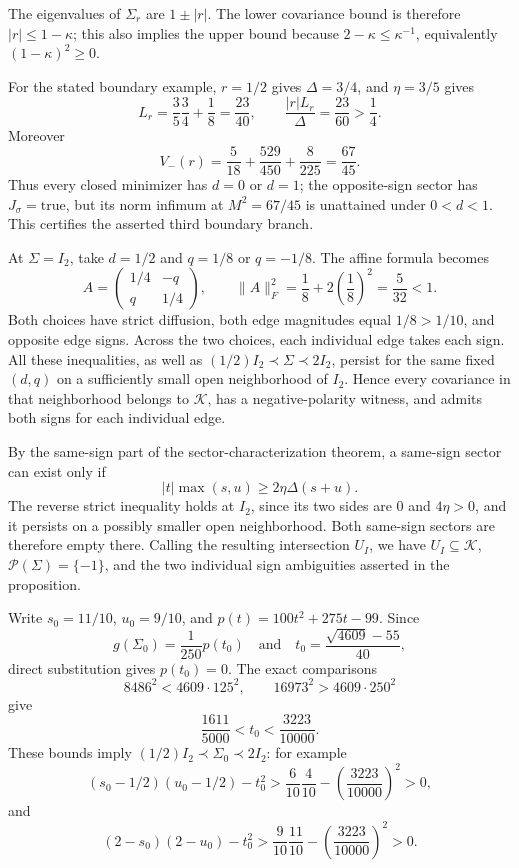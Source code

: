 The eigenvalues of \(\Sigma_r\) are \(1\pm|r|\).  The lower covariance bound is therefore \(|r|\le1-\kappa\); this also implies the upper bound because \(2-\kappa\le\kappa^{-1}\), equivalently \((1-\kappa)^2\ge0\).

For the stated boundary example, \(r=1/2\) gives \(\Delta=3/4\), and \(\eta=3/5\) gives
\[
 L_r=\frac35\frac34+\frac18=\frac{23}{40},\qquad
 \frac{|r|L_r}{\Delta}=\frac{23}{60}>\frac14.
\]
Moreover
\[
 V_-(r)=\frac5{18}+\frac{529}{450}+\frac8{225}=\frac{67}{45}.
\]
Thus every closed minimizer has \(d=0\) or \(d=1\); the opposite-sign sector has \(J_{\sigma}=\mathrm{true}\), but its norm infimum at \(M^2=67/45\) is unattained under \(0<d<1\).  This certifies the asserted third boundary branch.

At \(\Sigma=I_2\), take \(d=1/2\) and \(q=1/8\) or \(q=-1/8\).  The affine formula becomes
\[
 A=\begin{pmatrix}1/4&-q\\q&1/4\end{pmatrix},
 \qquad \lVert A\rVert_F^2=\frac18+2\left(\frac18\right)^2=\frac5{32}<1.
\]
Both choices have strict diffusion, both edge magnitudes equal \(1/8>1/10\), and opposite edge signs.  Across the two choices, each individual edge takes each sign.  All these inequalities, as well as \((1/2)I_2\prec\Sigma\prec2I_2\), persist for the same fixed \((d,q)\) on a sufficiently small open neighborhood of \(I_2\).  Hence every covariance in that neighborhood belongs to \(\mathcal K\), has a negative-polarity witness, and admits both signs for each individual edge.

By the same-sign part of the sector-characterization theorem, a same-sign sector can exist only if
\[
 |t|\max(s,u)\ge2\eta\Delta(s+u).
\]
The reverse strict inequality holds at \(I_2\), since its two sides are \(0\) and \(4\eta>0\), and it persists on a possibly smaller open neighborhood.  Both same-sign sectors are therefore empty there.  Calling the resulting intersection \(U_I\), we have \(U_I\subseteq\mathcal K\), \(\mathcal P(\Sigma)=\{-1\}\), and the two individual sign ambiguities asserted in the proposition.

Write \(s_0=11/10\), \(u_0=9/10\), and \(p(t)=100t^2+275t-99\).  Since
\[
 g(\Sigma_0)=\frac1{250}p(t_0)
 \quad\text{and}\quad
 t_0=\frac{\sqrt{4609}-55}{40},
\]
direct substitution gives \(p(t_0)=0\).  The exact comparisons
\[
 8486^2<4609\cdot125^2,\qquad
 16973^2>4609\cdot250^2
\]
give
\[
 \frac{1611}{5000}<t_0<\frac{3223}{10000}. \tag{9}
\]
These bounds imply \((1/2)I_2\prec\Sigma_0\prec2I_2\): for example
\[
 (s_0-1/2)(u_0-1/2)-t_0^2>\frac6{10}\frac4{10}-\left(\frac{3223}{10000}\right)^2>0,
\]
and
\[
 (2-s_0)(2-u_0)-t_0^2>\frac9{10}\frac{11}{10}-\left(\frac{3223}{10000}\right)^2>0.
\]


